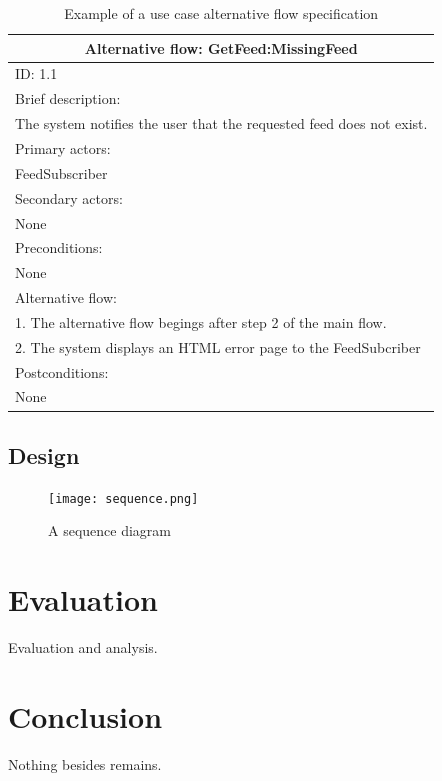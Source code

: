 \documentclass{article}
\begin{document}
\begin{table}[]
\begin{center}
\begin{tabular}{ | p{\textwidth} |}
\hline
\multicolumn{1}{|c|}{Alternative flow: GetFeed:MissingFeed} \\
\hline
ID: 1.1 \\
\hline
Brief description: \\
The system notifies the user that the requested feed does not exist. \\
\hline
Primary actors: \\
FeedSubscriber \\
\hline
Secondary actors: \\
None \\
\hline
Preconditions: \\
None \\
\hline
Alternative flow: \\
1. The alternative flow begings after step 2 of the main flow. \\
2. The system displays an HTML error page to the FeedSubcriber \\
\hline
Postconditions: \\
None \\
\hline
\end{tabular}
\end{center}
\caption{Example of a use case alternative flow specification}
\label{use-case-alt-detail}
\end{table}

\clearpage
\subsection{Design}

\begin{figure}
  \begin{center}
    \texttt{[image: sequence.png]}
  \end{center}
  \label{sequence}
  \caption{A sequence diagram}
\end{figure}

\section{Evaluation}
Evaluation and analysis.


\section{Conclusion}
Nothing besides remains.
\end{document}
